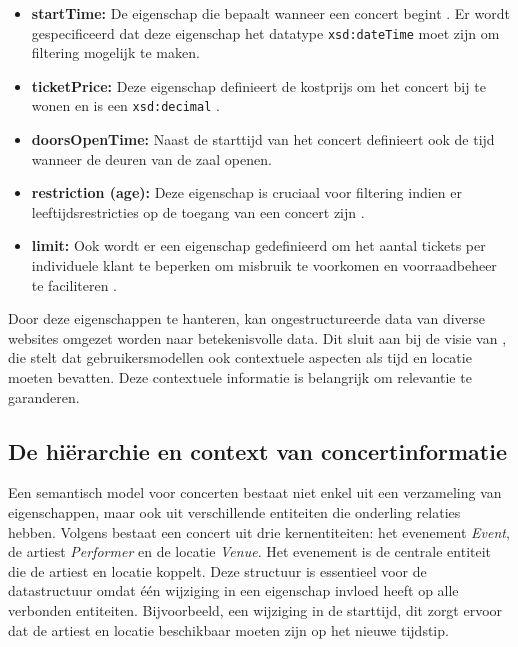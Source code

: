 \begin{itemize}
    \item \textbf{startTime:} De eigenschap die bepaalt wanneer een concert begint \autocite{Graves2003}.
    Er wordt gespecificeerd dat deze eigenschap het datatype \texttt{xsd:dateTime} moet zijn om filtering mogelijk te maken.
    \item \textbf{ticketPrice:} Deze eigenschap definieert de kostprijs om het concert bij te wonen en is een \texttt{xsd:decimal} \autocite{Graves2003}.
    \item \textbf{doorsOpenTime:} Naast de starttijd van het concert definieert \textcite{Graves2003} ook de tijd wanneer de deuren van de zaal openen.
    \item \textbf{restriction (age):} Deze eigenschap is cruciaal voor filtering indien er leeftijdsrestricties op de toegang van een concert zijn \autocite{Graves2003}.
    \item \textbf{limit:} Ook wordt er een eigenschap gedefinieerd om het aantal tickets per individuele klant te beperken om misbruik te voorkomen en voorraadbeheer te faciliteren \autocite{Graves2003}.
\end{itemize}

Door deze eigenschappen te hanteren, kan ongestructureerde data van diverse websites omgezet worden naar betekenisvolle data.
Dit sluit aan bij de visie van \textcite{Zangerle2018}, die stelt dat gebruikersmodellen ook contextuele aspecten als tijd en locatie moeten bevatten.
Deze contextuele informatie is belangrijk om relevantie te garanderen. 

\subsection{De hiërarchie en context van concertinformatie}

Een semantisch model voor concerten bestaat niet enkel uit een verzameling van eigenschappen,
maar ook uit verschillende entiteiten die onderling relaties hebben.
Volgens \textcite{Graves2003} bestaat een concert uit drie kernentiteiten: het evenement \textit{Event}, de artiest \textit{Performer} en de locatie \textit{Venue}.
Het evenement is de centrale entiteit die de artiest en locatie koppelt. Deze structuur is essentieel voor de datastructuur omdat één wijziging in een eigenschap invloed heeft op alle verbonden entiteiten.
Bijvoorbeeld, een wijziging in de starttijd, dit zorgt ervoor dat de artiest en locatie beschikbaar moeten zijn op het nieuwe tijdstip.

